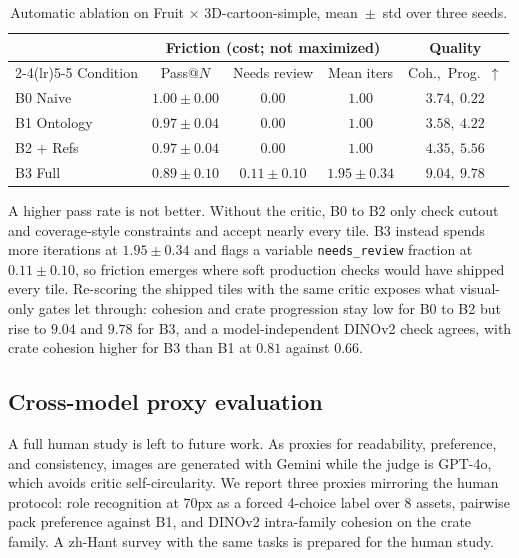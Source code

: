 \documentclass{article}
\begin{document}
\begin{table}[t]
  \centering
  \caption{Automatic ablation on Fruit $\times$ 3D-cartoon-simple, mean~$\pm$~std over three seeds.}
  \label{tab:ablation}
  \small
  \begin{tabular}{@{}lcccc@{}}
    \toprule
     & \multicolumn{3}{c}{Friction (cost; not maximized)} & Quality \\
    \cmidrule(lr){2-4}\cmidrule(lr){5-5}
    Condition & Pass@\(N\) & Needs review & Mean iters & Coh.,\ Prog.\ \(\uparrow\) \\
    \midrule
    B0 Naive    & \(1.00 \pm 0.00\) & \(0.00\) & \(1.00\) & \(3.74,\ 0.22\) \\
    B1 Ontology & \(0.97 \pm 0.04\) & \(0.00\) & \(1.00\) & \(3.58,\ 4.22\) \\
    B2 + Refs   & \(0.97 \pm 0.04\) & \(0.00\) & \(1.00\) & \(4.35,\ 5.56\) \\
    B3 Full     & \(0.89 \pm 0.10\) & \(0.11 \pm 0.10\) & \(1.95 \pm 0.34\) & \(9.04,\ 9.78\) \\
    \bottomrule
  \end{tabular}
\end{table}

A higher pass rate is not better. Without the critic, B0 to B2 only check cutout and coverage-style
constraints and accept nearly every tile. B3 instead spends more iterations at \(1.95 \pm 0.34\)
and flags a variable \texttt{needs\_review} fraction at \(0.11 \pm 0.10\), so friction emerges
where soft production checks would have shipped every tile.
Re-scoring the shipped tiles with the same critic exposes what visual-only gates let through:
cohesion and crate progression stay low for B0 to B2 but rise to \(9.04\) and \(9.78\) for B3, and
a model-independent DINOv2 check agrees, with crate cohesion higher for B3 than B1 at \(0.81\)
against \(0.66\).

\subsection{Cross-model proxy evaluation}
\label{sec:human}

A full human study is left to future work. As proxies for readability, preference, and
consistency, images are generated with Gemini while the judge is GPT-4o, which avoids critic
self-circularity. We report three proxies mirroring the human protocol: role recognition at
\(70\)px as a forced 4-choice label over 8 assets, pairwise pack preference against B1, and DINOv2
intra-family cohesion on the crate family. A zh-Hant survey with the same tasks is prepared for
the human study.
\end{document}
